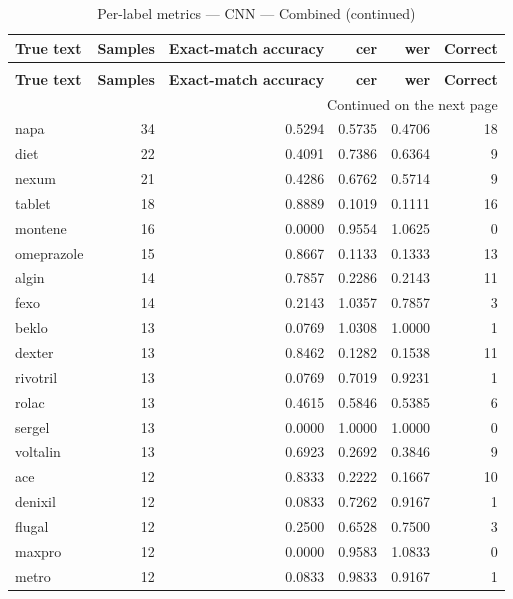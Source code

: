 \begingroup
\setlength{\tabcolsep}{2.5pt}
\renewcommand{\arraystretch}{1.05}
\sloppy
\scriptsize
\begin{longtable}{p{3.0cm}rrrrr}
\caption{Per-label metrics — CNN — Combined}\label{tab:e1-03cnn_evaluation-per-label}\\
\toprule
\textbf{True text} & \textbf{Samples} & \textbf{Exact-match accuracy} & \textbf{cer} & \textbf{wer} & \textbf{Correct} \\
\midrule
\endfirsthead
\caption*{Per-label metrics — CNN — Combined (continued)}\\
\toprule
\textbf{True text} & \textbf{Samples} & \textbf{Exact-match accuracy} & \textbf{cer} & \textbf{wer} & \textbf{Correct} \\
\midrule
\endhead
\midrule
\multicolumn{6}{r}{Continued on the next page}\\
\endfoot
\bottomrule
\endlastfoot
napa & 34 & 0.5294 & 0.5735 & 0.4706 & 18 \\
diet & 22 & 0.4091 & 0.7386 & 0.6364 & 9 \\
nexum & 21 & 0.4286 & 0.6762 & 0.5714 & 9 \\
tablet & 18 & 0.8889 & 0.1019 & 0.1111 & 16 \\
montene & 16 & 0.0000 & 0.9554 & 1.0625 & 0 \\
omeprazole & 15 & 0.8667 & 0.1133 & 0.1333 & 13 \\
algin & 14 & 0.7857 & 0.2286 & 0.2143 & 11 \\
fexo & 14 & 0.2143 & 1.0357 & 0.7857 & 3 \\
beklo & 13 & 0.0769 & 1.0308 & 1.0000 & 1 \\
dexter & 13 & 0.8462 & 0.1282 & 0.1538 & 11 \\
rivotril & 13 & 0.0769 & 0.7019 & 0.9231 & 1 \\
rolac & 13 & 0.4615 & 0.5846 & 0.5385 & 6 \\
sergel & 13 & 0.0000 & 1.0000 & 1.0000 & 0 \\
voltalin & 13 & 0.6923 & 0.2692 & 0.3846 & 9 \\
ace & 12 & 0.8333 & 0.2222 & 0.1667 & 10 \\
denixil & 12 & 0.0833 & 0.7262 & 0.9167 & 1 \\
flugal & 12 & 0.2500 & 0.6528 & 0.7500 & 3 \\
maxpro & 12 & 0.0000 & 0.9583 & 1.0833 & 0 \\
metro & 12 & 0.0833 & 0.9833 & 0.9167 & 1 \\

\end{longtable}
